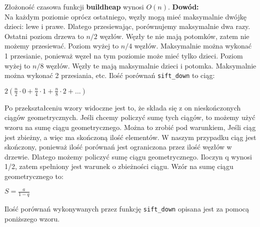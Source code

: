 \documentclass{article}
\begin{document}
    \begin{flushleft}
        Złożoność czasowa funkcji \textbf{buildheap} wynosi $O(n)$. \textbf{Dowód:} \\
        \vspace{1mm}
        Na każdym poziomie oprócz ostatniego, węzły mogą mieć maksymalnie dwójkę dzieci: lewe i prawe. Dlatego
        przesiewając, porównujemy maksymalnie dwa razy. Ostatni poziom drzewa to $n/2$ węzłów. 
        Węzły te nie mają potomków, zatem nie możemy przesiewać. Poziom wyżej to $n/4$ węzłów. Maksymalnie można wykonać 
        1 przesianie, ponieważ węzeł na tym poziomie może mieć tylko dzieci. Poziom wyżej to $n/8$ węzłów. Węzły te
        mają maksymalnie dzieci i potomka. Maksymalnie można wykonać 2 przesiania, etc. Ilość porównań \verb+sift_down+ to ciąg:
    \end{flushleft}
        
    \begin{center}
        $2(\frac{n}{2} \cdot 0 + \frac{n}{4} \cdot 1 + \frac{n}{8} \cdot 2 + ...)$
    \end{center}
 
    \noindent Po przekształceniu wzory widoczne jest to, że składa się z on nieskończonych ciągów geometrycznych. Jeśli chcemy 
    policzyć sumę tych ciągów, to możemy użyć wzoru na sumę ciągu geometrycznego. Można to zrobić pod warunkiem, Jeśli
    ciąg jest zbieżny, a więc ma skończoną ilość elementów. W naszym przypadku ciąg jest skończony, ponieważ
    ilość porównań jest ograniczona przez ilość węzłów w drzewie. Dlatego możemy policzyć sumę ciągu geometrycznego.
    Iloczyn q wynosi 1/2, zatem spełniony jest warunek o zbieżności ciągu. Wzór na sumę ciągu geometrycznego to:
    
    \begin{center}
        $S = \frac{a}{1-q}$
    \end{center}    

    Ilość porównań wykonywanych przez funkcję \verb+sift_down+ opisana jest za pomocą poniższego wzoru.
\end{document}
